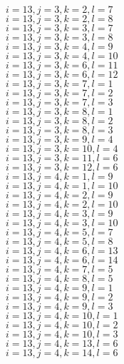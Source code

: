 \documentclass[14pt]{article}
\begin{document}
    $i=13,j=3,k=2,l=7 $ \\ 
    $i=13,j=3,k=2,l=8 $ \\ 
    $i=13,j=3,k=3,l=7 $ \\ 
    $i=13,j=3,k=3,l=8 $ \\ 
    $i=13,j=3,k=4,l=9 $ \\ 
    $i=13,j=3,k=4,l=10 $ \\ 
    $i=13,j=3,k=6,l=11 $ \\ 
    $i=13,j=3,k=6,l=12 $ \\ 
    $i=13,j=3,k=7,l=1 $ \\ 
    $i=13,j=3,k=7,l=2 $ \\ 
    $i=13,j=3,k=7,l=3 $ \\ 
    $i=13,j=3,k=8,l=1 $ \\ 
    $i=13,j=3,k=8,l=2 $ \\ 
    $i=13,j=3,k=8,l=3 $ \\ 
    $i=13,j=3,k=9,l=4 $ \\ 
    $i=13,j=3,k=10,l=4 $ \\ 
    $i=13,j=3,k=11,l=6 $ \\ 
    $i=13,j=3,k=12,l=6 $ \\ 
    $i=13,j=4,k=1,l=9 $ \\ 
    $i=13,j=4,k=1,l=10 $ \\ 
    $i=13,j=4,k=2,l=9 $ \\ 
    $i=13,j=4,k=2,l=10 $ \\ 
    $i=13,j=4,k=3,l=9 $ \\ 
    $i=13,j=4,k=3,l=10 $ \\ 
    $i=13,j=4,k=5,l=7 $ \\ 
    $i=13,j=4,k=5,l=8 $ \\ 
    $i=13,j=4,k=6,l=13 $ \\ 
    $i=13,j=4,k=6,l=14 $ \\ 
    $i=13,j=4,k=7,l=5 $ \\ 
    $i=13,j=4,k=8,l=5 $ \\ 
    $i=13,j=4,k=9,l=1 $ \\ 
    $i=13,j=4,k=9,l=2 $ \\ 
    $i=13,j=4,k=9,l=3 $ \\ 
    $i=13,j=4,k=10,l=1 $ \\ 
    $i=13,j=4,k=10,l=2 $ \\ 
    $i=13,j=4,k=10,l=3 $ \\ 
    $i=13,j=4,k=13,l=6 $ \\ 
    $i=13,j=4,k=14,l=6 $ \\ 
\end{document}
